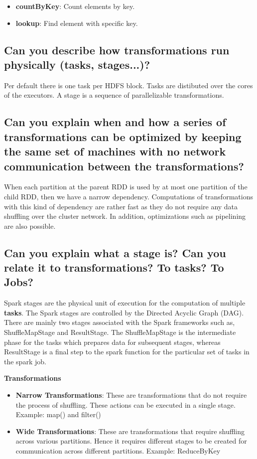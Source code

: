 \documentclass{article}
\begin{document}
\begin{itemize}
    \item \textbf{countByKey}: Count elements by key. 
    \item \textbf{lookup}: Find element with specific key. 
\end{itemize}

\subsection{Can you describe how transformations run physically (tasks, stages...)?}

Per default there is one task per HDFS block. Tasks are distibuted over the cores of the executors. A stage is a sequence of parallelizable transformations. 

\subsection{Can you explain when and how a series of transformations can be optimized by keeping the same set of machines with no network communication between the transformations?}

When each partition at the parent RDD is used by at most one partition of the child RDD, then we have a narrow dependency. Computations of transformations with this kind of dependency are rather fast as they do not require any data shuffling over the cluster network. In addition, optimizations such as pipelining are also possible.

\subsection{Can you explain what a stage is? Can you relate it to transformations? To tasks? To Jobs?}

Spark stages are the physical unit of execution for the computation of multiple \textbf{tasks}. The Spark stages are controlled by the Directed Acyclic Graph (DAG). There are mainly two stages associated with the Spark frameworks such as, ShuffleMapStage and ResultStage. The ShuffleMapStage is the intermediate phase for the tasks which prepares data for subsequent stages, whereas ResultStage is a final step to the spark function for the particular set of tasks in the spark job.

\textbf{Transformations}\\

\begin{itemize}
    \item \textbf{Narrow Transformations}: These are transformations that do not require the process of shuffling. These actions can be executed in a single stage. Example: map() and filter()
    \item \textbf{Wide Transformations}: These are transformations that require shuffling across various partitions. Hence it requires different stages to be created for communication across different partitions. Example: ReduceByKey
\end{itemize}
\end{document}
